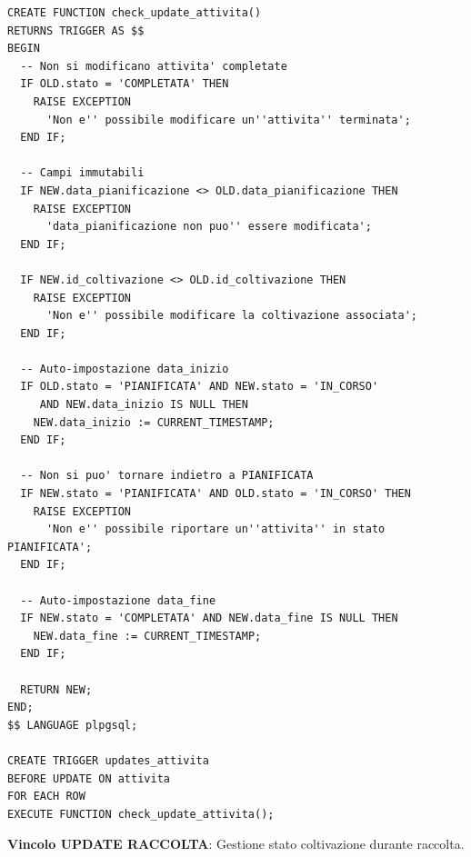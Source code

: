 \documentclass[12pt,a4paper]{article}
\begin{document}
\begin{lstlisting}[style=sqlstyle]
CREATE FUNCTION check_update_attivita() 
RETURNS TRIGGER AS $$ 
BEGIN 
  -- Non si modificano attivita' completate
  IF OLD.stato = 'COMPLETATA' THEN 
    RAISE EXCEPTION 
      'Non e'' possibile modificare un''attivita'' terminata';
  END IF;

  -- Campi immutabili
  IF NEW.data_pianificazione <> OLD.data_pianificazione THEN 
    RAISE EXCEPTION 
      'data_pianificazione non puo'' essere modificata';
  END IF;

  IF NEW.id_coltivazione <> OLD.id_coltivazione THEN 
    RAISE EXCEPTION 
      'Non e'' possibile modificare la coltivazione associata';
  END IF;

  -- Auto-impostazione data_inizio
  IF OLD.stato = 'PIANIFICATA' AND NEW.stato = 'IN_CORSO' 
     AND NEW.data_inizio IS NULL THEN 
    NEW.data_inizio := CURRENT_TIMESTAMP;
  END IF;

  -- Non si puo' tornare indietro a PIANIFICATA
  IF NEW.stato = 'PIANIFICATA' AND OLD.stato = 'IN_CORSO' THEN 
    RAISE EXCEPTION 
      'Non e'' possibile riportare un''attivita'' in stato PIANIFICATA';
  END IF;

  -- Auto-impostazione data_fine
  IF NEW.stato = 'COMPLETATA' AND NEW.data_fine IS NULL THEN 
    NEW.data_fine := CURRENT_TIMESTAMP;
  END IF;

  RETURN NEW;
END;
$$ LANGUAGE plpgsql;

CREATE TRIGGER updates_attivita
BEFORE UPDATE ON attivita
FOR EACH ROW
EXECUTE FUNCTION check_update_attivita();
\end{lstlisting}

\textbf{Vincolo UPDATE RACCOLTA}: Gestione stato coltivazione durante raccolta.
\end{document}
